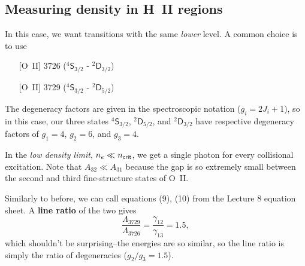 \documentclass{tufte-handout}
\renewcommand{\textbf}[1]{{\bf \textcolor{dark-gray}{#1}}}
\renewcommand{\rm}{\sf}
\renewcommand{\textrm}{\textsf}
\newcommand{\HII}{\textnormal{H{\smaller~\textsc{II}}}}
\renewcommand{\smallcaps}[1]{{\smaller~\textsc{#1}}}
\newcommand{\spec}[2]{\textnormal{#1}\smallcaps{#2}} %
\newcommand{\term}[4]{$^{#1}\textrm{#2}_{#3}^{\textrm{#4}}$}
\begin{document}
\subsection{Measuring density in \HII{} regions}
In this case, we want transitions with the same \textit{lower} level. A common choice is to use
\begin{itemize}
\item[] [\spec{O}{II}] 3726 (\term{4}{S}{3/2}{} - \term{2}{D}{3/2}{})\\
\item[] [\spec{O}{II}] 3729 (\term{4}{S}{3/2}{} - \term{2}{D}{5/2}{})
\end{itemize}
The degeneracy factors are given in the spectroscopic notation ($g_i = 2J_i + 1$), so in this case, our three states \term{4}{S}{3/2}{}, \term{2}{D}{5/2}{}, and \term{2}{D}{3/2}{} have respective degeneracy factors of $g_1 = 4$, $g_2 = 6$, and $g_3 =4$.


In the \textit{low density limit}, $n_e \ll n_{\rm crit}$, we get a single photon for every collisional excitation. Note that $A_{32} \ll A_{31}$ because the gap is so extremely small between the second and third fine-structure states of \spec{O}{II}.

Similarly to before, we can call equations (9), (10) from the Lecture 8 equation sheet. A \textbf{line ratio} of the two gives
\[\frac{\Lambda_{3729}}{\Lambda_{3726}} = \frac{\gamma_{12}}{\gamma_{13}} = 1.5,\]
which shouldn't be surprising--the energies are so similar, so the line ratio is simply the ratio of degeneracies ($g_2/g_3 = 1.5$).
\end{document}

